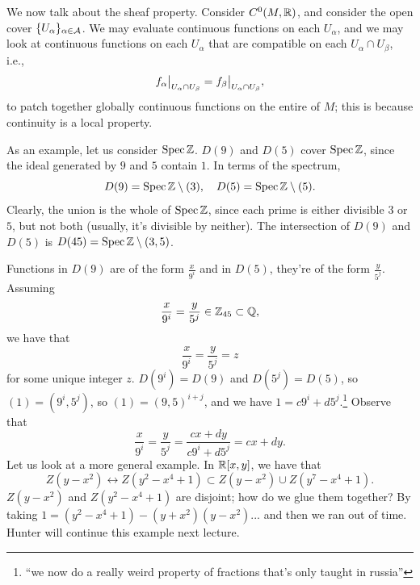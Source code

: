 We now talk about the sheaf property. Consider $C^0(M, \mathbb R)$, and consider the open cover $\{U_\alpha\}_{\alpha \in \mathcal A}$. We may evaluate continuous functions on each $U_\alpha$, and we may look at continuous functions on each $U_\alpha$ that are compatible on each $U_\alpha \cap U_\beta$, i.e.,
\[ \restr{f_\alpha}{U_\alpha \cap U_\beta} = \restr{f_\beta}{U_\alpha \cap U_\beta}, \]
to patch together globally continuous functions on the entire of $M$; this is because continuity is a local property.

As an example, let us consider $\operatorname{Spec} \mathbb Z$. $D(9)$ and $D(5)$ cover $\operatorname{Spec} \mathbb Z$, since the ideal generated by $9$ and $5$ contain $1$. In terms of the spectrum,
\[ D(9) = \operatorname{Spec} \mathbb Z \setminus (3), \quad D(5) = \operatorname{Spec} \mathbb Z \setminus (5). \]
Clearly, the union is the whole of $\operatorname{Spec} \mathbb Z$, since each prime is either divisible $3$ or $5$, but not both (usually, it's divisible by neither). The intersection of $D(9)$ and $D(5)$ is $D(45) = \operatorname{Spec} \mathbb Z \setminus (3, 5)$. 

\newpage
Functions in $D(9)$ are of the form $\frac{x}{9^i}$ and in $D(5)$, they're of the form $\frac{y}{5^j}$. Assuming
\[ \frac{x}{9^i} = \frac{y}{5^j} \in \mathbb Z_{45} \subset \mathbb Q, \]
we have that
\[ \frac{x}{9^i} = \frac{y}{5^j} = z \]
for some unique integer $z$. $D(9^i) = D(9)$ and $D(5^j) = D(5)$, so $(1) = (9^i, 5^j)$, so $(1) = (9, 5)^{i+j}$, and we have $1 = c9^i + d5^j$.\footnote{``we now do a really weird property of fractions that's only taught in russia''} Observe that
\[ \frac{x}{9^i} = \frac{y}{5^j} = \frac{cx + dy}{c 9^i + d 5^j} = cx + dy. \]
Let us look at a more general example. In $\mathbb R[x, y]$, we have that
\[ Z(y - x^2) \leftrightarrow Z(y^2 - x^4 + 1) \subset Z(y - x^2) \cup Z(y^7 - x^4 + 1). \]
$Z(y - x^2)$ and $Z(y^2 - x^4 + 1)$ are disjoint; how do we glue them together? By taking $1 = (y^2 - x^4 + 1) - (y + x^2)(y - x^2)$... and then we ran out of time. Hunter will continue this example next lecture.